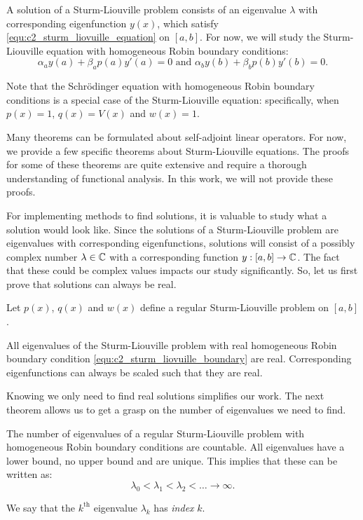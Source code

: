 A solution of a Sturm-Liouville problem consists of an eigenvalue $\lambda$ with corresponding eigenfunction $y(x)$, which satisfy \eqref{equ:c2_sturm_liovuille_equation} on $[a, b]$. For now, we will study the Sturm-Liouville equation with homogeneous Robin boundary conditions:
\begin{equation}\label{equ:c2_sturm_liovuille_boundary}
    \alpha_a y(a) + \beta_a p(a) y'(a) = 0 \text{ and } \alpha_b y(b) + \beta_b p(b) y'(b) = 0\text{.}
\end{equation}

Note that the Schrödinger equation with homogeneous Robin boundary conditions is a special case of the Sturm-Liouville equation: specifically, when $p(x) = 1$, $q(x) = V(x)$ and $w(x) = 1$.

Many theorems can be formulated about self-adjoint linear operators. For now, we provide a few specific theorems about Sturm-Liouville equations. The proofs for some of these theorems are quite extensive and require a thorough understanding of functional analysis. In this work, we will not provide these proofs.

For implementing methods to find solutions, it is valuable to study what a solution would look like. Since the solutions of a Sturm-Liouville problem are eigenvalues with corresponding eigenfunctions, solutions will consist of a possibly complex number $\lambda \in \mathbb{C}$ with a corresponding function $y : [a, b] \to \mathbb{C}$. The fact that these could be complex values impacts our study significantly. So, let us first prove that solutions can always be real.

\begin{theorem}\label{the:c2_real_eigenvalues}
    Let $p(x)$, $q(x)$ and $w(x)$ define a regular Sturm-Liouville problem on $[a, b]$.

    All eigenvalues of the Sturm-Liouville problem with real homogeneous Robin boundary condition \eqref{equ:c2_sturm_liovuille_boundary} are real. Corresponding eigenfunctions can always be scaled such that they are real.
\end{theorem}

Knowing we only need to find real solutions simplifies our work. The next theorem allows us to get a grasp on the number of eigenvalues we need to find.

\begin{theorem}\label{the:c2_slp_countable}
    The number of eigenvalues of a regular Sturm-Liouville problem with homogeneous Robin boundary conditions are countable. All eigenvalues have a lower bound, no upper bound and are unique. This implies that these can be written as:
    $$
        \lambda_0 < \lambda_1 < \lambda_2 < \dots \to \infty \text{.}
    $$

    We say that the $k^{\text{th}}$ eigenvalue $\lambda_k$ has \emph{index} $k$.
\end{theorem}

